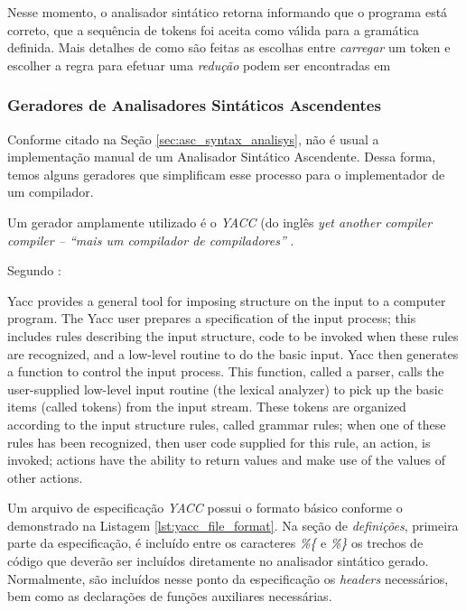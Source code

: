 Nesse momento, o analisador sintático retorna informando que o programa está
correto, que a sequência de tokens foi aceita como válida para a gramática
definida. Mais detalhes de como são feitas as escolhas entre \emph{carregar} um token
e escolher a regra para efetuar uma \emph{redução} podem ser encontradas em

\subsubsection{Geradores de Analisadores Sintáticos Ascendentes}
\label{sec:yacc}

Conforme citado na Seção \ref{sec:asc_syntax_analisys}, não é usual a
implementação manual de um Analisador Sintático Ascendente. Dessa forma, temos
alguns geradores que simplificam esse processo para o implementador de um
compilador.

Um gerador amplamente utilizado é o \emph{YACC} (do inglês \emph{yet another
compiler compiler {--} ``mais um compilador de compiladores''}
\cite{louden97-pt}.

Segundo :

\begin{citacao}{4cm}{0cm}
Yacc provides a general tool for imposing structure on the input to a computer
program. The Yacc user prepares a specification of the input process; this
includes rules describing the input structure, code to be invoked when these
rules are recognized, and a low-level routine to do the basic input. Yacc then
generates a function to control the input process. This function, called a
parser, calls the user-supplied low-level input routine (the lexical analyzer)
to pick up the basic items (called tokens) from the input stream. These tokens
are organized according to the input structure rules, called grammar rules;
when one of these rules has been recognized, then user code supplied for this
rule, an action, is invoked; actions have the ability to return values and
make use of the values of other actions.
\end{citacao}

Um arquivo de especificação \emph{YACC} possui o formato básico conforme
o demonstrado na Listagem \ref{lst:yacc_file_format}. Na seção de
\emph{definições}, primeira parte da especificação, é incluído entre os
caracteres \emph{\%\{} e \emph{\%\}} os trechos de código que deverão ser
incluídos diretamente no analisador sintático gerado. Normalmente, são
incluídos nesse ponto da especificação os \emph{headers} necessários, bem
como as declarações de funções auxiliares necessárias.

